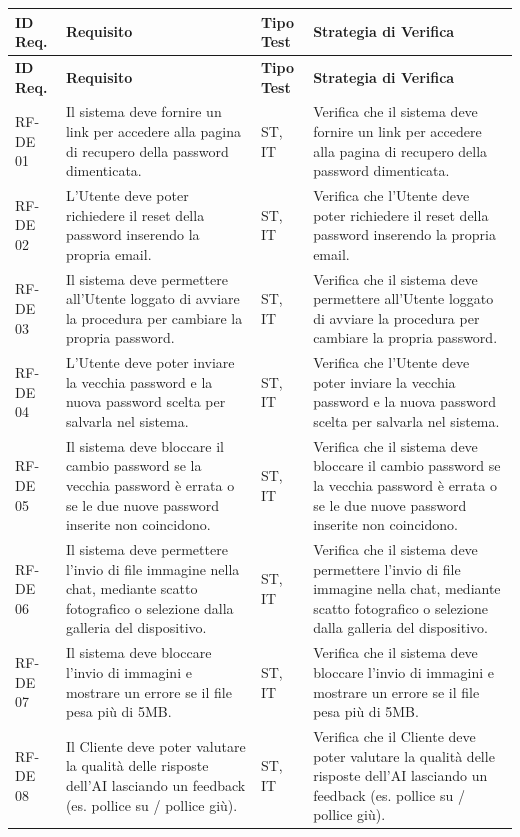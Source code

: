 \documentclass[a4paper,11pt,oneside]{scrartcl}
\begin{document}
\begin{longtable}{|p{1.5cm}|p{5.5cm}|p{1.8cm}|p{5cm}|}
\hline
\textbf{ID Req.} & \textbf{Requisito} & \textbf{Tipo Test} & \textbf{Strategia di Verifica} \\
\hline
\endfirsthead
\hline
\textbf{ID Req.} & \textbf{Requisito} & \textbf{Tipo Test} & \textbf{Strategia di Verifica} \\
\hline
\endhead

RF-DE 01 & Il sistema deve fornire un link per accedere alla pagina di recupero della password dimenticata. & ST, IT & Verifica che il sistema deve fornire un link per accedere alla pagina di recupero della password dimenticata. \\ \hline
RF-DE 02 & L'Utente deve poter richiedere il reset della password inserendo la propria email. & ST, IT & Verifica che l'Utente deve poter richiedere il reset della password inserendo la propria email. \\ \hline
RF-DE 03 & Il sistema deve permettere all'Utente loggato di avviare la procedura per cambiare la propria password. & ST, IT & Verifica che il sistema deve permettere all'Utente loggato di avviare la procedura per cambiare la propria password. \\ \hline
RF-DE 04 & L'Utente deve poter inviare la vecchia password e la nuova password scelta per salvarla nel sistema. & ST, IT & Verifica che l'Utente deve poter inviare la vecchia password e la nuova password scelta per salvarla nel sistema. \\ \hline
RF-DE 05 & Il sistema deve bloccare il cambio password se la vecchia password è errata o se le due nuove password inserite non coincidono. & ST, IT & Verifica che il sistema deve bloccare il cambio password se la vecchia password è errata o se le due nuove password inserite non coincidono. \\ \hline
RF-DE 06 & Il sistema deve permettere l'invio di file immagine nella chat, mediante scatto fotografico o selezione dalla galleria del dispositivo. & ST, IT & Verifica che il sistema deve permettere l'invio di file immagine nella chat, mediante scatto fotografico o selezione dalla galleria del dispositivo. \\ \hline
RF-DE 07 & Il sistema deve bloccare l'invio di immagini e mostrare un errore se il file pesa più di 5MB. & ST, IT & Verifica che il sistema deve bloccare l'invio di immagini e mostrare un errore se il file pesa più di 5MB. \\ \hline
RF-DE 08 & Il Cliente deve poter valutare la qualità delle risposte dell'AI lasciando un feedback (es. pollice su / pollice giù). & ST, IT & Verifica che il Cliente deve poter valutare la qualità delle risposte dell'AI lasciando un feedback (es. pollice su / pollice giù). \\ \hline

\end{longtable}
\end{document}
